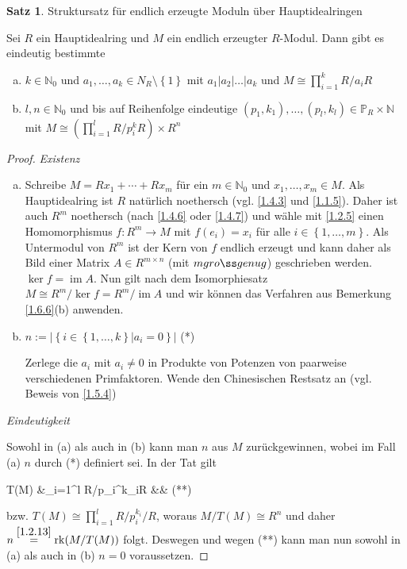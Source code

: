 \documentclass[
twoside=semi,
fontsize=12,
DIV=12, 
cleardoublepage=current,
leqno,
headings=optiontoheadandtoc, 
toc=idx
]{scrbook}
\newcommand{\N}{\mathbb{N}}
\renewcommand{\P}{\mathbb{P}}
\newcommand{\brac}[1]{\left( #1 \right)}
\newcommand{\set}[1]{\left\{ #1 \right\}}
\DeclareMathOperator{\im}{im}
\DeclareMathOperator{\rk}{rk}
\theoremstyle{definition}
\newtheorem{satz}[definition]{Satz}
\begin{document}
	\begin{satz}\label{1.6.9}
		Struktursatz f\"ur endlich erzeugte Moduln \"uber Hauptidealringen
		
		Sei $R$ ein Hauptidealring und $M$ ein endlich erzeugter $R$-Modul. Dann gibt es eindeutig bestimmte
		
		\begin{enumerate}[(a)]
			\item 
			$k\in \N_0$ und $a_1, \dots, a_k \in N_R\setminus \set{1}$ mit $a_1|a_2|\dots|a_k$ und $M\cong \prod_{i=1}^kR/a_iR$
 			
			\item $l, n\in \N_0$ und bis auf Reihenfolge eindeutige $(p_1, k_1), \dots, (p_l, k_l) \in \P_R \times \N$ mit $M \cong \brac{\prod_{i=1}^l R/p_i^kR} \times R^n$
		\end{enumerate}
	
		\begin{proof}
			\emph{Existenz}
			\begin{enumerate}[(a)]
				\item 
				Schreibe $M = Rx_1 + \cdots + Rx_m$ f\"ur ein $m \in \N_0$ und $x_1, \dots, x_m \in M$. Als Hauptidealring ist $R$ nat\"urlich noethersch (vgl. \ref{1.4.3} und \ref{1.1.5}). Daher ist auch $R^m$ noethersch (nach \ref{1.4.6} oder \ref{1.4.7}) und w\"ahle mit \ref{1.2.5} einen Homomorphismus $f: R^m \to M$ mit $f(e_i) = x_i$ f\"ur alle $i \in \set{1, \dots, m}$. Als Untermodul von $R^m$ ist der Kern von $f$ endlich erzeugt und kann daher als Bild einer Matrix $A\in R^{m\times n}$ (mit $m gro\ss genug$) geschrieben werden. $\ker f = \im A$. Nun gilt nach dem Isomorphiesatz $M \cong R^m/\ker f = R^m / \im A$ und wir k\"onnen das Verfahren aus Bemerkung \ref{1.6.6}(b) anwenden.
				
				\item $n:= |\set{i \in \set{1, \dots, k}| a_i = 0}|$ (*)
				
				Zerlege die $a_i$ mit $a_i \neq 0$ in Produkte von Potenzen von paarweise verschiedenen Primfaktoren. Wende den Chinesischen Restsatz an (vgl. Beweis von \ref{1.5.4})
			\end{enumerate}
			
			\emph{Eindeutigkeit}
			
			Sowohl in (a) als auch in (b) kann man $n$ aus $M$ zur\"uckgewinnen, wobei im Fall (a) $n$ durch (*) definiert sei. In der Tat gilt
				\begin{flalign*}
					T(M) &\cong \prod_{i=1}^l R/p_i^{k_i}R && (**)
				\end{flalign*}
			bzw. $T(M) \cong \prod_{i=1}^l R/p_i^{k_i}/R$, woraus $M/T(M) \cong R^n$ und daher $n \overset{\ref{1.2.13}}{=} \rk(M/T(M))$ folgt. Deswegen und wegen (**) kann man nun sowohl in (a) als auch in (b) $n=0$ voraussetzen. 
			

\end{proof}
\end{satz}
\end{document}

